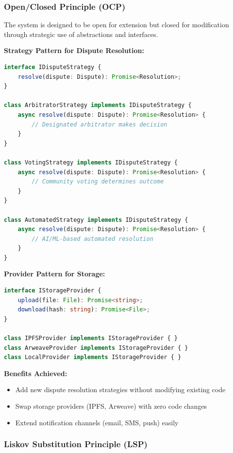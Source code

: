 \documentclass[a4paper,13pt,twoside]{report}
\theoremstyle{definition}
\begin{document}
\subsubsection{Open/Closed Principle (OCP)}

The system is designed to be open for extension but closed for modification through strategic use of abstractions and interfaces.

\textbf{Strategy Pattern for Dispute Resolution:}
\begin{lstlisting}[language=TypeScript, caption=Dispute Resolution Strategy]
interface IDisputeStrategy {
    resolve(dispute: Dispute): Promise<Resolution>;
}

class ArbitratorStrategy implements IDisputeStrategy {
    async resolve(dispute: Dispute): Promise<Resolution> {
        // Designated arbitrator makes decision
    }
}

class VotingStrategy implements IDisputeStrategy {
    async resolve(dispute: Dispute): Promise<Resolution> {
        // Community voting determines outcome
    }
}

class AutomatedStrategy implements IDisputeStrategy {
    async resolve(dispute: Dispute): Promise<Resolution> {
        // AI/ML-based automated resolution
    }
}
\end{lstlisting}

\textbf{Provider Pattern for Storage:}
\begin{lstlisting}[language=TypeScript, caption=Storage Provider Abstraction]
interface IStorageProvider {
    upload(file: File): Promise<string>;
    download(hash: string): Promise<File>;
}

class IPFSProvider implements IStorageProvider { }
class ArweaveProvider implements IStorageProvider { }
class LocalProvider implements IStorageProvider { }
\end{lstlisting}

\textbf{Benefits Achieved:}
\begin{itemize}
    \item Add new dispute resolution strategies without modifying existing code
    \item Swap storage providers (IPFS, Arweave) with zero code changes
    \item Extend notification channels (email, SMS, push) easily
\end{itemize}

\subsubsection{Liskov Substitution Principle (LSP)}
\end{document}
